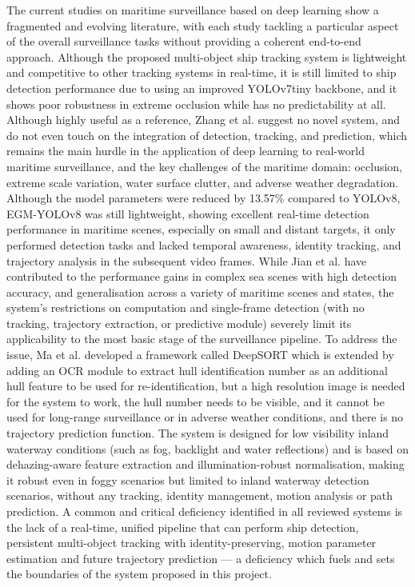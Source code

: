 The current studies on maritime surveillance based on deep learning show a fragmented and evolving literature, with each study tackling a particular aspect of the overall surveillance tasks without providing a coherent end-to-end approach. Although the proposed multi-object ship tracking system is lightweight and competitive to other tracking systems in real-time, it is still limited to ship detection performance due to using an improved YOLOv7tiny backbone, and it shows poor robustness in extreme occlusion while has no predictability at all. Although highly useful as a reference, Zhang et al. suggest no novel system, and do not even touch on the integration of detection, tracking, and prediction, which remains the main hurdle in the application of deep learning to real-world maritime surveillance, and the key challenges of the maritime domain: occlusion, extreme scale variation, water surface clutter, and adverse weather degradation. 
Although the model parameters were reduced by 13.57\% compared to YOLOv8, EGM-YOLOv8 was still lightweight, showing excellent real-time detection performance in maritime scenes, especially on small and distant targets, it only performed detection tasks and lacked temporal awareness, identity tracking, and trajectory analysis in the subsequent video frames. While Jian et al. have contributed to the performance gains in complex sea scenes with high detection accuracy, and generalisation across a variety of maritime scenes and states, the system's restrictions on computation and single-frame detection (with no tracking, trajectory extraction, or predictive module) severely limit its applicability to the most basic stage of the surveillance pipeline. 
To address the issue, Ma et al. developed a framework called DeepSORT which is extended by adding an OCR module to extract hull identification number as an additional hull feature to be used for re-identification, but a high resolution image is needed for the system to work, the hull number needs to be visible, and it cannot be used for long-range surveillance or in adverse weather conditions, and there is no trajectory prediction function. The system is designed for low visibility inland waterway conditions (such as fog, backlight and water reflections) and is based on dehazing-aware feature extraction and illumination-robust normalisation, making it robust even in foggy scenarios but limited to inland waterway detection scenarios, without any tracking, identity management, motion analysis or path prediction. 
A common and critical deficiency identified in all reviewed systems is the lack of a real-time, unified pipeline that can perform ship detection, persistent multi-object tracking with identity-preserving, motion parameter estimation and future trajectory prediction — a deficiency which fuels and sets the boundaries of the system proposed in this project.

